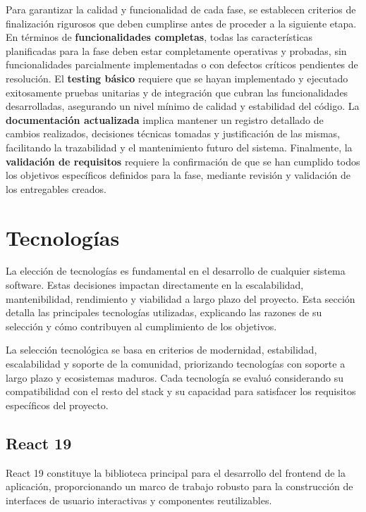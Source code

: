 \documentclass[12pt,a4paper,oneside]{report}
\begin{document}
Para garantizar la calidad y funcionalidad de cada fase, se establecen criterios de finalización rigurosos que deben cumplirse antes de proceder a la siguiente etapa. En términos de \textbf{funcionalidades completas}, todas las características planificadas para la fase deben estar completamente operativas y probadas, sin funcionalidades parcialmente implementadas o con defectos críticos pendientes de resolución. El \textbf{testing básico} requiere que se hayan implementado y ejecutado exitosamente pruebas unitarias y de integración que cubran las funcionalidades desarrolladas, asegurando un nivel mínimo de calidad y estabilidad del código. La \textbf{documentación actualizada} implica mantener un registro detallado de cambios realizados, decisiones técnicas tomadas y justificación de las mismas, facilitando la trazabilidad y el mantenimiento futuro del sistema. Finalmente, la \textbf{validación de requisitos} requiere la confirmación de que se han cumplido todos los objetivos específicos definidos para la fase, mediante revisión y validación de los entregables creados.

\section{Tecnologías}\label{tecnologuxedas}

La elección de tecnologías es fundamental en el desarrollo de cualquier sistema software. Estas decisiones impactan directamente en la escalabilidad, mantenibilidad, rendimiento y viabilidad a largo plazo del proyecto. Esta sección detalla las principales tecnologías utilizadas, explicando las razones de su selección y cómo contribuyen al cumplimiento de los objetivos.

La selección tecnológica se basa en criterios de modernidad, estabilidad, escalabilidad y soporte de la comunidad, priorizando tecnologías con soporte a largo plazo y ecosistemas maduros. Cada tecnología se evaluó considerando su compatibilidad con el resto del stack y su capacidad para satisfacer los requisitos específicos del proyecto.

\subsection{React 19}\label{react-19}

React 19 constituye la biblioteca principal para el desarrollo del
frontend de la aplicación, proporcionando un marco de trabajo robusto
para la construcción de interfaces de usuario interactivas y componentes
reutilizables.
\end{document}
